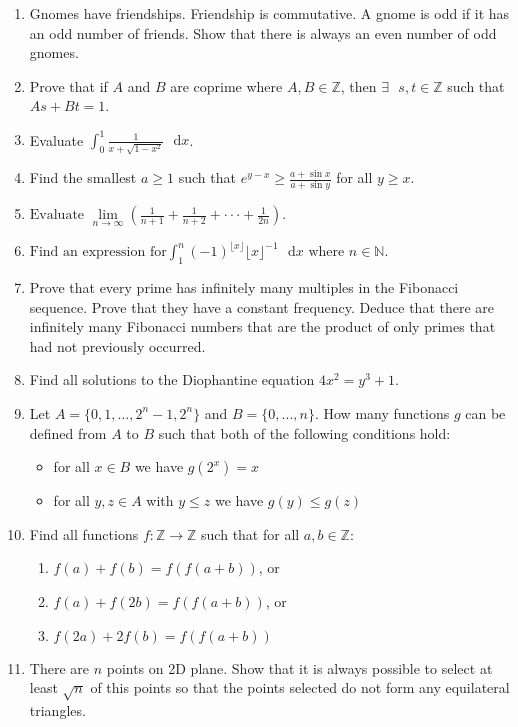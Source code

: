 \documentclass[a4paper]{article}
\begin{document}
\begin{enumerate}
    \item
    Gnomes have friendships. Friendship is commutative. A gnome is odd if it has an odd number of friends. Show that there is always an even number of odd gnomes.
    
    \item
    Prove that if $A$ and $B$ are coprime where $A,B \in \mathbb{Z}$, then $\exists \text{ } s,t \in \mathbb{Z}$ such that $As+Bt=1$.
    
    \item
    Evaluate $\int_{0}^{1} \frac{1}{x+\sqrt{1-x^2}}  \text{ } \mathrm{d}x$.
    
    \item
    Find the smallest $a \geq 1$ such that $e^{y - x} \geq \frac{a + \sin x}{a + \sin y}$ for all $y \geq x$.
    
    \item
    $
        \text{Evaluate } \lim\limits_{n\to\infty} (\frac{1}{n+1} + \frac{1}{n+2} + \cdot \cdot \cdot + \frac{1}{2n})\text{.}
    $
    
    
    \item
    $
        \text{Find an expression for} \int_{1}^{n} (-1)^{\lfloor x \rfloor} \lfloor x \rfloor^{-1} \text{ } \mathrm{d}x \text{ where } n \in \mathbb{N}.
    $
    
    \item
    Prove that every prime has infinitely many multiples in the Fibonacci sequence. Prove that they have a constant frequency. Deduce that there are infinitely many Fibonacci numbers that are the product of only primes that had not previously occurred.
    
    \item
    Find all solutions to the Diophantine equation $4x^2 = y^3 + 1$.
    
    \item 
    Let $A = \{0, 1, ..., 2^n - 1, 2^n\}$ and $B = \{0, ..., n \}$. How many functions $g$ can be defined from $A$ to $B$ such that both of the following conditions hold:
    \begin{itemize}
        \item for all $x \in B$ we have $g(2^x) = x$
        \item for all $y, z \in A$ with $y \leq z$ we have $g(y) \leq g(z)$
    \end{itemize}
    
    
    \item
    Find all functions $f: \mathbb{Z} \to \mathbb{Z}$ such that for all $a,b \in \mathbb{Z}$:
    \begin{enumerate}
        \item $f(a)+f(b) = f(f(a+b))$, or
        \item $f(a)+f(2b) = f(f(a+b))$, or
        \item $f(2a)+2f(b) = f(f(a+b))$
    \end{enumerate}
    
    \item
    There are $n$ points on 2D plane. Show that it is always possible to select at least $\sqrt{n}$ of this points so that the points selected do not form any equilateral triangles.
\end{enumerate}
\end{document}
